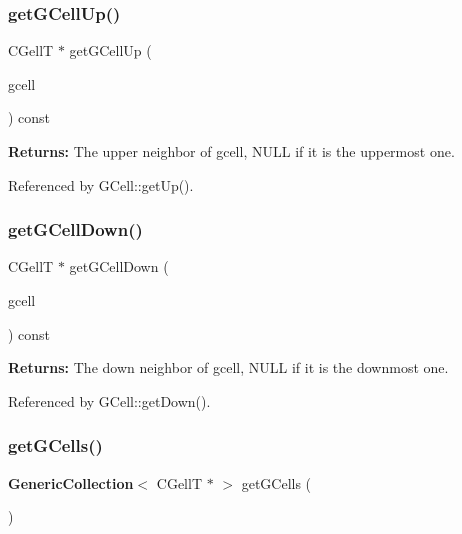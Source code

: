 \subsubsection{\texorpdfstring{get\+G\+Cell\+Up()}{getGCellUp()}}
{\footnotesize\ttfamily C\+GellT $\ast$ get\+G\+Cell\+Up (\begin{DoxyParamCaption}\item[{const G\+CellT $\ast$}]{gcell }\end{DoxyParamCaption}) const\hspace{0.3cm}{\ttfamily [inline]}}

{\bfseries Returns\+:} The upper neighbor of {\ttfamily gcell}, {\ttfamily N\+U\+LL} if it is the uppermost one. 

Referenced by G\+Cell\+::get\+Up().

\mbox{\label{classKatabatic_1_1Grid_a4288eb8b1357d9800341b82df6b23944}} 
\subsubsection{\texorpdfstring{get\+G\+Cell\+Down()}{getGCellDown()}}
{\footnotesize\ttfamily C\+GellT $\ast$ get\+G\+Cell\+Down (\begin{DoxyParamCaption}\item[{const G\+CellT $\ast$}]{gcell }\end{DoxyParamCaption}) const\hspace{0.3cm}{\ttfamily [inline]}}

{\bfseries Returns\+:} The down neighbor of {\ttfamily gcell}, {\ttfamily N\+U\+LL} if it is the downmost one. 

Referenced by G\+Cell\+::get\+Down().

\mbox{\label{classKatabatic_1_1Grid_a24b4ab5b46b56ee744cf4c368a114d95}} 
\subsubsection{\texorpdfstring{get\+G\+Cells()}{getGCells()}}
{\footnotesize\ttfamily \textbf{ Generic\+Collection}$<$ C\+GellT $\ast$ $>$ get\+G\+Cells (\begin{DoxyParamCaption}{ }\end{DoxyParamCaption})\hspace{0.3cm}{\ttfamily [inline]}}

